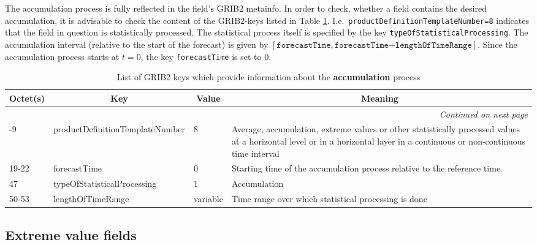 The accumulation process is fully reflected in the field's GRIB2 metainfo. In order to check, whether a field contains the desired accumulation, 
it is advisable to check the content of the GRIB2-keys listed in Table \ref{tab_GRIB2acc}.
I.e.\ \texttt{productDefinitionTemplateNumber=8} indicates that the field in question is statistically processed. The statistical process itself 
is specified by the key \texttt{typeOfStatisticalProcessing}. The accumulation interval (relative to the start of the forecast) is given by 
$[\texttt{forecastTime},\texttt{forecastTime+lengthOfTimeRange}]$. Since the accumulation process starts at $t=0$, the key \texttt{forecastTime} 
is set to 0. 
\begin{longtable}{p{1.2cm}p{5.5cm}p{1.0cm}p{6.0cm}}
\caption[]{List of GRIB2 keys which provide information about the \textbf{accumulation} process}\label{tab_GRIB2acc}\\
  \toprule
\multicolumn{1}{c}{\textbf{Octet(s)}}  &  \multicolumn{1}{c}{\textbf{Key}}  & \multicolumn{1}{c}{\textbf{Value}} & \multicolumn{1}{c}{\textbf{Meaning}} \\
\midrule
\endhead
\hline \multicolumn{4}{r}{\textit{Continued on next page}} \\
\endfoot
\endlastfoot
 8-9        &  productDefinitionTemplateNumber             &     8               &    Average, accumulation, extreme values or other statistically processed values at a horizontal level or in a horizontal layer in a continuous or non-continuous time interval   \\
 19-22      &  forecastTime                                &     0               &    Starting time of the accumulation process relative to the reference time. \\
 47         &  typeOfStatisticalProcessing                 &     1               &    Accumulation                                  \\
 50-53      &  lengthOfTimeRange                           &    variable         &    Time range over which statistical processing is done \\
\bottomrule
\end{longtable}



\subsection{Extreme value fields}

